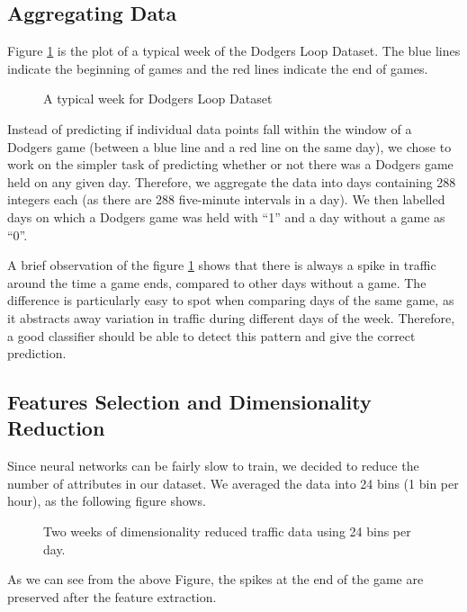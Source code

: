 \documentclass[conference]{IEEEtran}
\begin{document}
		\subsection{Aggregating Data}
		
		Figure \ref{fig:typical-week} is the plot of a typical week of the Dodgers Loop Dataset. The blue lines indicate the beginning of games and the red lines indicate the end of games. 
		
		\begin{figure}[H]
			\centering
			\caption{A typical week for Dodgers Loop Dataset}
			\label{fig:typical-week}
		\end{figure}
		
		Instead of predicting if individual data points fall within the window of a Dodgers game (between a blue line and a red line on the same day), we chose to work on the simpler task of predicting whether or not there was a Dodgers game held on any given day.
		Therefore, we aggregate the data into days containing 288 integers each (as there are 288 five-minute intervals in a day). We then labelled days on which a Dodgers game was held with ``1'' and a day without a game as ``0''. 
		
		A brief observation of the figure \ref{fig:typical-week} shows that there is always a spike in traffic around the time a game ends, compared to other days without a game. The difference is particularly easy to spot when comparing days of the same game, as it abstracts away variation in traffic during different days of the week. Therefore, a good classifier should be able to detect this pattern and give the correct prediction.
		
		\subsection{Features Selection and Dimensionality Reduction}
		Since neural networks can be fairly slow to train, we decided to reduce the number of attributes in our dataset. We averaged the data into 24 bins (1 bin per hour), as the following figure shows.
		
		\begin{figure}[H]
			\caption{Two weeks of dimensionality reduced traffic data using 24 bins per day.}
			\label{fig:two-weeks-reduced-dimensionality}
		\end{figure}
		As we can see from the above Figure, the spikes at the end of the game are preserved after the feature extraction.
		
\end{document}
